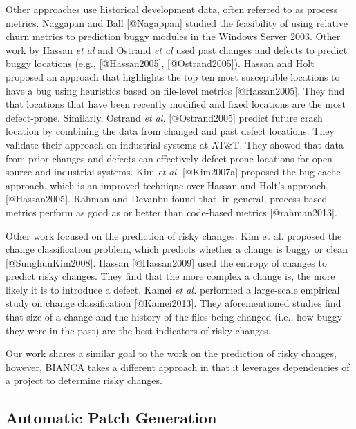 Other approaches use historical development data, often referred to as
process metrics. Naggapan and Ball {[}@Nagappan{]} studied the
feasibility of using relative churn metrics to prediction buggy modules
in the Windows Server 2003. Other work by Hassan \emph{et al} and
Ostrand \emph{et al} used past changes and defects to predict buggy
locations (e.g., {[}@Hassan2005{]}, {[}@Ostrand2005{]}). Hassan and Holt
proposed an approach that highlights the top ten most susceptible
locations to have a bug using heuristics based on file-level metrics
{[}@Hassan2005{]}. They find that locations that have been recently
modified and fixed locations are the most defect-prone. Similarly,
Ostrand \emph{et al.} {[}@Ostrand2005{]} predict future crash location
by combining the data from changed and past defect locations. They
validate their approach on industrial systems at AT\&T. They showed that
data from prior changes and defects can effectively defect-prone
locations for open-source and industrial systems. Kim \emph{et al.}
{[}@Kim2007a{]} proposed the bug cache approach, which is an improved
technique over Hassan and Holt's approach {[}@Hassan2005{]}. Rahman and
Devanbu found that, in general, process-based metrics perform as good as
or better than code-based metrics {[}@rahman2013{]}.

Other work focused on the prediction of risky changes. Kim et al.
proposed the change classification problem, which predicts whether a
change is buggy or clean {[}@SunghunKim2008{]}. Hassan {[}@Hassan2009{]}
used the entropy of changes to predict risky changes. They find that the
more complex a change is, the more likely it is to introduce a defect.
Kamei \emph{et al.} performed a large-scale empirical study on change
classification {[}@Kamei2013{]}. They aforementioned studies find that
size of a change and the history of the files being changed (i.e., how
buggy they were in the past) are the best indicators of risky changes.

Our work shares a similar goal to the work on the prediction of risky
changes, however, BIANCA takes a different approach in that it leverages
dependencies of a project to determine risky changes.

\subsection{Automatic Patch
Generation}\label{automatic-patch-generation}

